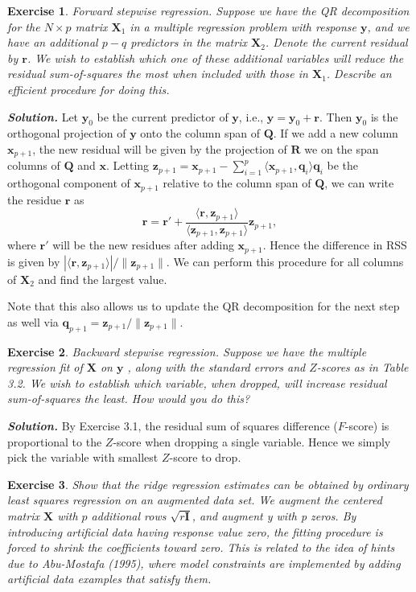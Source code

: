 \documentclass[12pt]{article}
\def\bQ{\textbf{Q}}
\def\bx{\textbf{x}}
\def\bz{\textbf{z}}
\def\bX{\textbf{X}}
\def\by{\textbf{y}}
\def\br{\textbf{r}}
\def\bR{\textbf{R}}
\def\bQ{\textbf{Q}}
\def\bq{\textbf{q}}
\newtheorem{exercise}{Exercise}[section]
\newenvironment{solution}[1][\it{Solution}]{\textbf{#1. } }{\vspace{.5cm}}
\begin{document}
\begin{exercise}
    Forward stepwise regression. Suppose we have the QR decomposition for the $N \times p$ matrix $\bX_1$ in a multiple regression problem with response $\by$, and we have an additional $p-q$ predictors in the matrix 
$\bX_2$. Denote the current residual by $\br$. We wish to establish which one of these additional variables will reduce the residual sum-of-squares the most when included with those in 
$\bX_1$. Describe an efficient procedure for doing this.
\end{exercise}
\begin{solution}
Let $\by_0$ be the current predictor of $\by$, i.e., $\by = \by_0 + \br$. Then $\by_0$ is the orthogonal projection of $\by$ onto the column span of $\bQ$. If we add a new column $\bx_{p+1}$, the new residual will be given by the projection of $\bR$ we on the span columns of $\bQ$ and $\bx$.  Letting $\bz_{p+1}= \bx_{p+1} - \sum_{i=1}^p \langle \bx_{p+1}, \bq_i \rangle \bq_i$ be the orthogonal component of $\bx_{p+1}$ relative to the column span of $\bQ$, we can write the residue $\br$ as 
$$\br = \br' + \frac{\langle \br, \bz_{p+1}\rangle}{\langle \bz_{p+1}, \bz_{p+1}\rangle} \bz_{p+1},$$
where $\br'$ will be the new residues after adding $\bx_{p+1}$. Hence the difference in RSS is given by $|\langle \br, \bz_{p+1} \rangle |/\|\bz_{p+1}\|$. We can perform this procedure for all columns of $\bX_2$ and find the largest value. 

Note that this also allows us to update the QR decomposition for the next step as well via $\bq_{p+1} = \bz_{p+1}/\|\bz_{p+1}\|$.
\end{solution}

\begin{exercise} Backward stepwise regression. Suppose we have the multiple regression fit of 
$\bX$ on $\by$ , along with the standard errors and $Z$-scores as in Table 3.2. We wish to establish which variable, when dropped, will increase residual sum-of-squares the least. How would you do this?
\end{exercise}
\begin{solution}
    By Exercise 3.1, the residual sum of squares difference ($F$-score) is proportional to the $Z$-score when dropping a single variable. Hence we simply pick the variable with smallest $Z$-score to drop.
\end{solution}


\begin{exercise} Show that the ridge regression estimates can be obtained by ordinary least squares regression on an augmented data set. We augment
the centered matrix $\bX$ with $p$ additional rows $\sqrt{r\mathbf{I}}$, and augment y with p
zeros. By introducing artificial data having response value zero, the fitting
procedure is forced to shrink the coefficients toward zero. This is related to
the idea of hints due to Abu-Mostafa (1995), where model constraints are
implemented by adding artificial data examples that satisfy them.
\end{exercise}
\end{document}

